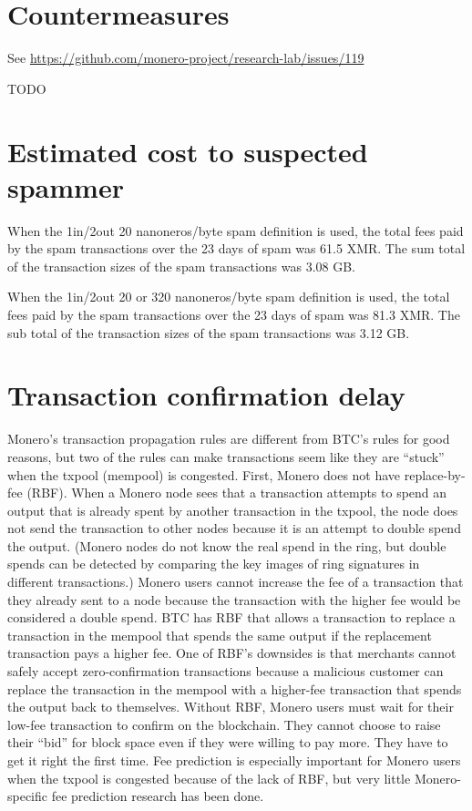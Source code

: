 \documentclass[usletter,11pt,english,openany]{article}
\begin{document}
\section{Countermeasures}

See \url{https://github.com/monero-project/research-lab/issues/119}

TODO

\section{Estimated cost to suspected spammer}

When the 1in/2out 20 nanoneros/byte spam definition is used, the total
fees paid by the spam transactions over the 23 days of spam was 61.5
XMR. The sum total of the transaction sizes of the spam transactions
was 3.08 GB.

When the 1in/2out 20 or 320 nanoneros/byte spam definition is used,
the total fees paid by the spam transactions over the 23 days of spam
was 81.3 XMR. The sub total of the transaction sizes of the spam transactions
was 3.12 GB.

\section{Transaction confirmation delay}

Monero's transaction propagation rules are different from BTC's rules
for good reasons, but two of the rules can make transactions seem
like they are ``stuck'' when the txpool (mempool) is congested.
First, Monero does not have replace-by-fee (RBF). When a Monero node
sees that a transaction attempts to spend an output that is already
spent by another transaction in the txpool, the node does not send
the transaction to other nodes because it is an attempt to double
spend the output. (Monero nodes do not know the real spend in the
ring, but double spends can be detected by comparing the key images
of ring signatures in different transactions.) Monero users cannot
increase the fee of a transaction that they already sent to a node
because the transaction with the higher fee would be considered a
double spend. BTC has RBF that allows a transaction to replace a transaction
in the mempool that spends the same output if the replacement transaction
pays a higher fee. One of RBF's downsides is that merchants cannot
safely accept zero-confirmation transactions because a malicious customer
can replace the transaction in the mempool with a higher-fee transaction
that spends the output back to themselves. Without RBF, Monero users
must wait for their low-fee transaction to confirm on the blockchain.
They cannot choose to raise their ``bid'' for block space even if
they were willing to pay more. They have to get it right the first
time. Fee prediction is especially important for Monero users when
the txpool is congested because of the lack of RBF, but very little
Monero-specific fee prediction research has been done.
\end{document}
